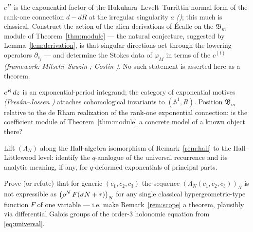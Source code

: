 \documentclass{article}
\newcommand{\tmem}[1]{{\em #1\/}}
\newcommand{\CA}{\mathfrak{B}}
\begin{document}
\begin{problem}
  \label{prob:resurgence} $e^{\Pi}$ is the exponential
  factor of the Hukuhara--Levelt--Turrittin normal form of the rank-one
  connection $d - dR$ at the irregular singularity $a$
  {\tmem{({\cite[Ch.~3]{vdPS}})}}; this much is classical. Construct the
  action of the alien derivations of {\'E}calle on the $\CA_m$-module of
  Theorem~\ref{thm:module} --- the natural conjecture, suggested by
  Lemma~\ref{lem:derivation}, is that singular directions act through the
  lowering operators $\partial_{c_j}$ --- and determine the Stokes data of
  $\varphi_M$ in terms of the $c^{(i)}$ {\tmem{(framework: Mitschi--Sauzin
  {\cite{MitschiSauzin}}; Costin {\cite{Costin}})}}. No such statement is
  asserted here as a theorem.
\end{problem}

\begin{problem}
  \label{prob:motives} $e^R  \hspace{0.17em} dz$ is an
  exponential-period integrand; the category of exponential motives
  {\tmem{(Fres{\'a}n--Jossen {\cite{FresanJossen}})}} attaches cohomological
  invariants to $(\mathbb{A}^1, R)$. Position $\CA_m$ relative to the de Rham
  realization of the rank-one exponential connection: is the coefficient
  module of Theorem~\ref{thm:module} a concrete model of a known object there?
\end{problem}

\begin{problem}
  [$q$-lift]\label{prob:hall} Lift $(\Lambda_N)$ along the Hall-algebra
  isomorphism of Remark~\ref{rem:hall} to the Hall--Littlewood level: identify
  the $q$-analogue of the universal recurrence and its analytic meaning, if
  any, for $q$-deformed exponentials of principal parts.
\end{problem}

\begin{problem}
  \label{prob:nonreduction} Prove (or refute) that for generic
  $(c_1, c_2, c_3)$ the sequence $(\Lambda_N (c_1, c_2, c_3))_N$ is not
  expressible as $\left( \rho^N  \hspace{0.17em} F (\sigma N + \tau)
  \right)_N$ for any single classical hypergeometric-type function $F$ of one
  variable --- i.e. make Remark~\ref{rem:scope} a theorem, plausibly via
  differential Galois groups of the order-$3$ holonomic equation from
  \eqref{eq:universal}.
\end{problem}
\end{document}
